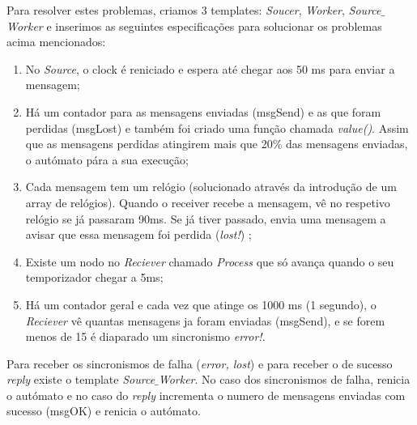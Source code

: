 \documentclass[12pt]{article} %
\begin{document}
Para resolver estes problemas, criamos 3 templates: {\it{Soucer}}, {\it{Worker}}, {\it{Source$\_$Worker}} e inserimos as seguintes especificações para solucionar os problemas acima mencionados:

\begin{enumerate}
\item No {\it{Source}}, o clock é reniciado e espera até chegar aos 50 ms para enviar a mensagem;
\item Há um contador para as mensagens enviadas (msgSend) e as que foram perdidas (msgLost) e também foi criado uma função chamada {\it{value()}}. Assim que as mensagens perdidas atingirem mais que 20$\%$ das mensagens enviadas, o autómato pára a sua execução;
\item Cada mensagem tem um relógio (solucionado através da introdução de um array de relógios). Quando o receiver recebe a mensagem, vê no respetivo  relógio se já passaram 90ms. Se já tiver passado, envia uma mensagem a avisar que essa mensagem foi perdida ({\it{lost!}}) ;
\item Existe um nodo no {\it{Reciever}} chamado {\it{Process}} que só avança quando o seu temporizador chegar a 5ms;
\item Há um contador geral e cada vez que atinge os 1000 ms (1 segundo), o {\it{Reciever}} vê quantas mensagens ja foram enviadas (msgSend), e se forem menos de 15 é diaparado um sincronismo {\it{error!}}.
\end{enumerate}

Para receber os sincronismos de falha ({\it{error, lost}}) e para receber o de sucesso {\it{reply}} existe o template {\it{Source$\_$Worker}}. No caso dos sincronismos de falha, renicia o autómato e no caso do 
{\it{reply}} incrementa o numero de mensagens enviadas com sucesso (msgOK) e renicia o autómato.



\end{document}
